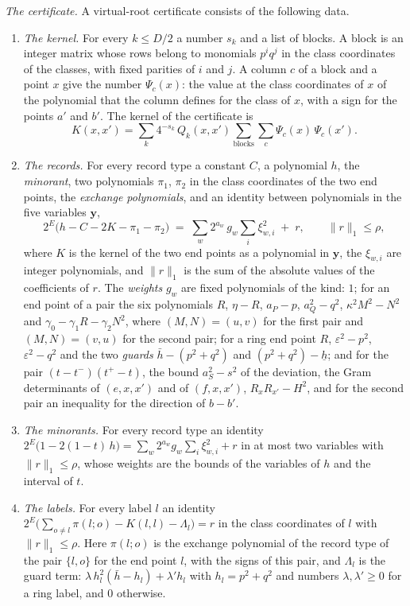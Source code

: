 \documentclass[reqno,a4paper,11pt]{amsart}
\numberwithin{equation}{section}
\begin{document}
\emph{The certificate.} A virtual-root certificate consists of the following data.
\begin{enumerate}
    \item[(a)] \emph{The kernel.} For every $k \leq D/2$ a number $s_k$ and a list of blocks. A block is an integer matrix whose rows belong to monomials $p^i q^j$ in the class coordinates of the classes, with fixed parities of $i$ and $j$. A column $c$ of a block and a point $x$ give the number $\Psi_c(x)$: the value at the class coordinates of $x$ of the polynomial that the column defines for the class of $x$, with a sign for the points $a'$ and $b'$. The kernel of the certificate is
    $$
    K(x, x') = \sum_k 4^{-s_k} \, Q_k(x, x') \sum_{\text{blocks}} \sum_c \Psi_c(x) \, \Psi_c(x') .
    $$
    \item[(b)] \emph{The records.} For every record type a constant $C$, a polynomial $h$, the \emph{minorant}, two polynomials $\pi_1$, $\pi_2$ in the class coordinates of the two end points, the \emph{exchange polynomials}, and an identity between polynomials in the five variables $\mathbf{y}$,
    \begin{equation}\label{eq:vrrecord}
    2^E \big( h - C - 2 K - \pi_1 - \pi_2 \big) \;=\; \sum_w 2^{a_w} \, g_w \sum_i \xi_{w,i}^2 \;+\; r , \qquad \|r\|_1 \leq \rho ,
    \end{equation}
    where $K$ is the kernel of the two end points as a polynomial in $\mathbf{y}$, the $\xi_{w,i}$ are integer polynomials, and $\|r\|_1$ is the sum of the absolute values of the coefficients of $r$. The \emph{weights} $g_w$ are fixed polynomials of the kind: $1$; for an end point of a pair the six polynomials $R$, $\eta - R$, $a_P - p$, $a_Q^2 - q^2$, $\kappa^2 M^2 - N^2$ and $\gamma_0 - \gamma_1 R - \gamma_2 N^2$, where $(M, N) = (u, v)$ for the first pair and $(M, N) = (v, u)$ for the second pair; for a ring end point $R$, $\varepsilon^2 - p^2$, $\varepsilon^2 - q^2$ and the two \emph{guards} $\bar h - (p^2 + q^2)$ and $(p^2 + q^2) - \underline h$; and for the pair $(t - t^-)(t^+ - t)$, the bound $a_S^2 - s^2$ of the deviation, the Gram determinants of $(e, x, x')$ and of $(f, x, x')$, $R_x R_{x'} - H^2$, and for the second pair an inequality for the direction of $b - b'$.
    \item[(c)] \emph{The minorants.} For every record type an identity $2^E \big( 1 - 2 (1 - t) \, h \big) = \sum_w 2^{a_w} g_w \sum_i \xi_{w,i}^2 + r$ in at most two variables with $\|r\|_1 \leq \rho$, whose weights are the bounds of the variables of $h$ and the interval of $t$.
    \item[(d)] \emph{The labels.} For every label $l$ an identity $2^E \big( \sum_{o \neq l} \pi(l; o) - K(l, l) - \Lambda_l \big) = r$ in the class coordinates of $l$ with $\|r\|_1 \leq \rho$. Here $\pi(l; o)$ is the exchange polynomial of the record type of the pair $\{l, o\}$ for the end point $l$, with the signs of this pair, and $\Lambda_l$ is the guard term: $\lambda \, h_l^2 (\bar h - h_l) + \lambda' h_l$ with $h_l = p^2 + q^2$ and numbers $\lambda, \lambda' \geq 0$ for a ring label, and $0$ otherwise.
\end{enumerate}
\end{document}
